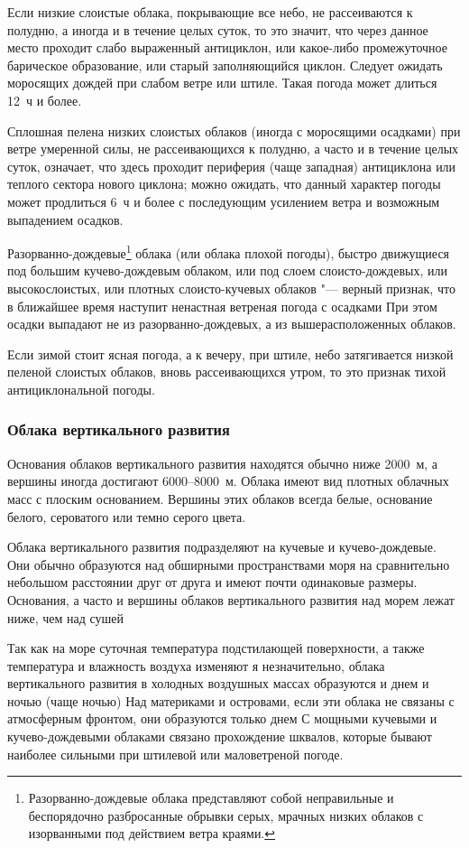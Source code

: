  Если низкие слоистые облака, покрывающие все небо, не
рассеиваются к полудню, а иногда и в течение целых суток, то это
значит, что через данное место проходит слабо выраженный антициклон,
или какое-либо промежуточное барическое образование, или старый
заполняющийся циклон. Следует ожидать моросящих дождей при слабом
ветре или штиле. Такая погода может длиться 12~ч и более.

 Сплошная пелена низких слоистых облаков (иногда с моросящими
осадками) при ветре умеренной силы, не рассеивающихся к полудню, а
часто и в течение целых суток, означает, что здесь проходит периферия
(чаще западная) антициклона или теплого сектора нового циклона; можно
ожидать, что данный характер погоды может продлиться 6~ч и более с
последующим усилением ветра и возможным выпадением осадков.

 Разорванно-дождевые\footnote{Разорванно-дождевые облака
  представляют собой неправильные и беспорядочно разбросанные обрывки
  серых, мрачных низких облаков с изорванными под действием ветра
  краями.} облака (или облака плохой погоды), быстро движущиеся под
большим кучево-дождевым облаком, или под слоем слоисто-дождевых, или
высокослоистых, или плотных слоисто-кучевых облаков "--- верный
признак, что в ближайшее время наступит ненастная ветреная погода с
осадками При этом осадки выпадают не из разорванно-дождевых, а из
вышерасположенных облаков.

 Если зимой стоит ясная погода, а к вечеру, при штиле, небо
затягивается низкой пеленой слоистых облаков, вновь рассеивающихся
утром, то это признак тихой антициклональной погоды.

\subsubsection{Облака вертикального развития}

Основания облаков вертикального развития находятся обычно ниже 2000~м,
а вершины иногда достигают 6000--8000~м. Облака имеют вид плотных
облачных масс с плоским основанием. Вершины этих облаков всегда белые,
основание белого, сероватого или темно серого цвета.

Облака вертикального развития подразделяют на кучевые и
кучево-дождевые. Они обычно образуются над обширными пространствами
моря на сравнительно небольшом расстоянии друг от друга и имеют почти
одинаковые размеры. Основания, а часто и вершины облаков вертикального
развития над морем лежат ниже, чем над сушей

Так как на море суточная температура подстилающей поверхности, а также
температура и влажность воздуха изменяют я незначительно, облака
вертикального развития в холодных воздушных массах образуются и днем и
ночью (чаще ночью) Над материками и островами, если эти облака не
связаны с атмосферным фронтом, они образуются только днем С мощными
кучевыми и кучево-дождевыми облаками связано прохождение шквалов,
которые бывают наиболее сильными при штилевой или маловетреной погоде.


